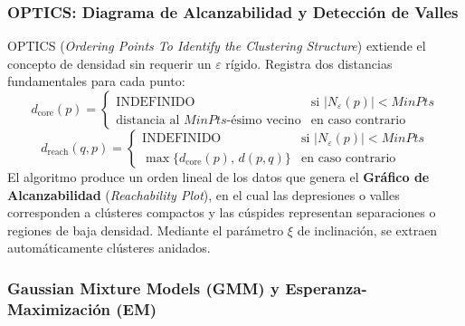 \subsubsection{OPTICS: Diagrama de Alcanzabilidad y Detección de Valles}

OPTICS (\textit{Ordering Points To Identify the Clustering Structure}) \cite{ankerst1999} extiende el concepto de densidad sin requerir un $\varepsilon$ rígido. Registra dos distancias fundamentales para cada punto:
\begin{equation}
    d_{\text{core}}(p) = \begin{cases} \text{INDEFINIDO} & \text{si } |N_\varepsilon(p)| < MinPts \\ \text{distancia al } MinPts\text{-ésimo vecino} & \text{en caso contrario} \end{cases}
\end{equation}
\begin{equation}
    d_{\text{reach}}(q, p) = \begin{cases} \text{INDEFINIDO} & \text{si } |N_\varepsilon(p)| < MinPts \\ \max \{ d_{\text{core}}(p), \, d(p, q) \} & \text{en caso contrario} \end{cases}
\end{equation}
El algoritmo produce un orden lineal de los datos que genera el \textbf{Gráfico de Alcanzabilidad} (\textit{Reachability Plot}), en el cual las depresiones o valles corresponden a clústeres compactos y las cúspides representan separaciones o regiones de baja densidad. Mediante el parámetro $\xi$ de inclinación, se extraen automáticamente clústeres anidados.

\subsubsection{Gaussian Mixture Models (GMM) y Esperanza-Maximización (EM)}

